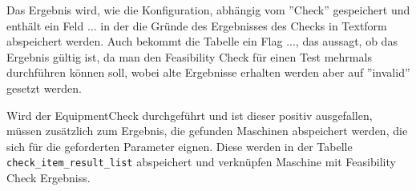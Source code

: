 Das Ergebnis wird, wie die Konfiguration, abhängig vom ''Check'' gespeichert und enthält ein Feld ... in der die Gründe des Ergebnisses des Checks in Textform abspeichert werden. Auch bekommt die Tabelle ein Flag ..., das aussagt, ob das Ergebnis gültig ist, da man den Feasibility Check für einen Test mehrmals durchführen können soll, wobei alte Ergebnisse erhalten werden aber auf ''invalid'' gesetzt werden.

Wird der \gls{EquipmentCheck} durchgeführt und ist dieser positiv ausgefallen, müssen zusätzlich zum Ergebnis, die gefunden Maschinen abspeichert werden, die sich für die geforderten Parameter eignen. Diese werden in der Tabelle \texttt{check\_item\_result\_list} abspeichert und verknüpfen Maschine mit Feasibility Check Ergebniss.

